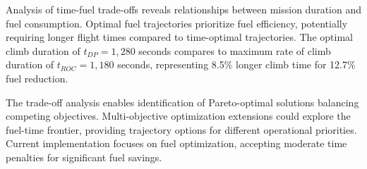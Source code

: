 Analysis of time-fuel trade-offs reveals relationships between mission duration and fuel consumption. Optimal fuel trajectories prioritize fuel efficiency, potentially requiring longer flight times compared to time-optimal trajectories. The optimal climb duration of $t_{DP} = 1,280$ seconds compares to maximum rate of climb duration of $t_{ROC} = 1,180$ seconds, representing 8.5\% longer climb time for 12.7\% fuel reduction.

The trade-off analysis enables identification of Pareto-optimal solutions balancing competing objectives. Multi-objective optimization extensions could explore the fuel-time frontier, providing trajectory options for different operational priorities. Current implementation focuses on fuel optimization, accepting moderate time penalties for significant fuel savings.